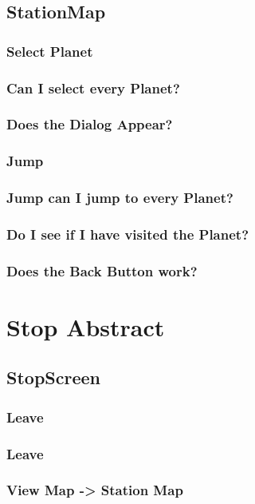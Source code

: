 \documentclass[11pt]{article}
\begin{document}
\subsection{StationMap}

\subsubsection{Select Planet}

\subsubsection{Can I select every Planet?}
\subsubsection{Does the Dialog Appear?}
\subsubsection{ Jump}
\subsubsection{Jump can I jump to every Planet?}
\subsubsection{Do I see if I have visited the Planet?}
\subsubsection{ Does the Back Button work?}


\section{Stop Abstract}
\label{sec:org3bde3ec}

\subsection{StopScreen}

\subsubsection{Leave}

\subsubsection{Leave}
\subsubsection{View Map -> Station Map}
\end{document}

